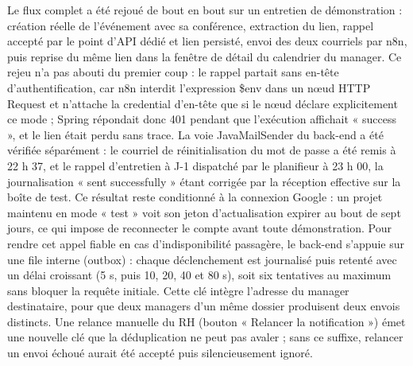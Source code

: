 Le flux complet a été rejoué de bout en bout sur un entretien de démonstration : création réelle de l’événement avec sa conférence, extraction du lien, rappel accepté par le point d’API dédié et lien persisté, envoi des deux courriels par n8n, puis reprise du même lien dans la fenêtre de détail du calendrier du manager. Ce rejeu n’a pas abouti du premier coup : le rappel partait sans en-tête d’authentification, car n8n interdit l’expression \$env dans un nœud HTTP Request et n’attache la credential d’en-tête que si le nœud déclare explicitement ce mode ; Spring répondait donc 401 pendant que l’exécution affichait « success », et le lien était perdu sans trace. La voie JavaMailSender du back-end a été vérifiée séparément : le courriel de réinitialisation du mot de passe a été remis à 22 h 37, et le rappel d’entretien à J-1 dispatché par le planifieur à 23 h 00, la journalisation « sent successfully » étant corrigée par la réception effective sur la boîte de test. Ce résultat reste conditionné à la connexion Google : un projet maintenu en mode « test » voit son jeton d’actualisation expirer au bout de sept jours, ce qui impose de reconnecter le compte avant toute démonstration. Pour rendre cet appel fiable en cas d’indisponibilité passagère, le back-end s’appuie sur une file interne (outbox) : chaque déclenchement est journalisé puis retenté avec un délai croissant (5 s, puis 10, 20, 40 et 80 s), soit six tentatives au maximum sans bloquer la requête initiale. Cette clé intègre l’adresse du manager destinataire, pour que deux managers d’un même dossier produisent deux envois distincts. Une relance manuelle du RH (bouton « Relancer la notification ») émet une nouvelle clé que la déduplication ne peut pas avaler ; sans ce suffixe, relancer un envoi échoué aurait été accepté puis silencieusement ignoré.

